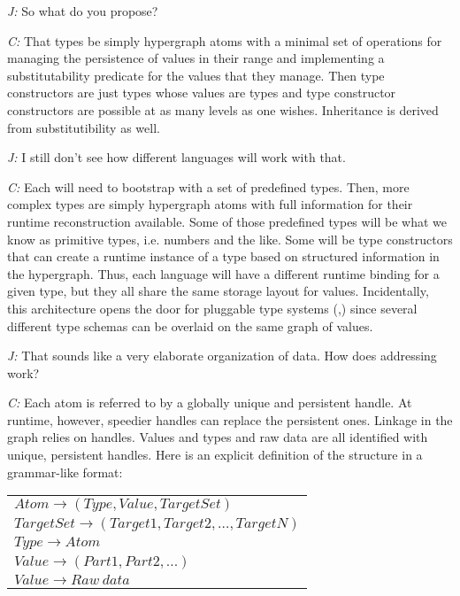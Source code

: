 \documentclass[10pt]{sigplanconf}
\begin{document}
\emph{J:} So what do you propose?

\emph{C:} That types be simply hypergraph atoms with a minimal set of operations for managing the persistence of values in their range and implementing a substitutability predicate for the values that they manage. Then type constructors are just types whose values are types and type constructor constructors are possible at as many levels as one wishes. Inheritance is derived from substitutibility as well.

\emph{J:} I still don't see how different languages will work with that.

\emph{C:} Each will need to bootstrap with a set of predefined types. Then, more complex types are simply hypergraph atoms with full information for their runtime reconstruction available. Some of those predefined types will be what we know as primitive types, i.e. numbers and the like. Some will be type constructors that can create a runtime instance of a type based on structured information in the hypergraph. Thus, each language will have a different runtime binding for a given type, but they all share the same storage layout for values. Incidentally, this architecture opens the door for pluggable type systems (\cite{bracha},\cite{andreae}) since several different type schemas can be overlaid on the same graph of values.

\emph{J:} That sounds like a very elaborate organization of data. How does addressing work?

\emph{C:} Each atom is referred to by a globally unique and persistent handle. At runtime, however, speedier handles can replace the persistent ones. Linkage in the graph relies on handles. Values and types and raw data are all identified with unique, persistent handles. Here is an explicit definition of the structure in a grammar-like format:

\vspace{10pt}

\begin{tabular}{l}
$Atom \rightarrow (Type, Value, TargetSet)$ \\
$TargetSet \rightarrow (Target1, Target2,\ldots, TargetN)$ \\
$Type \rightarrow Atom$ \\
$Value \rightarrow (Part1, Part2, ...)$ \\
$Value \rightarrow Raw~data$ \\
\end{tabular}

\vspace{10pt}
\end{document}
